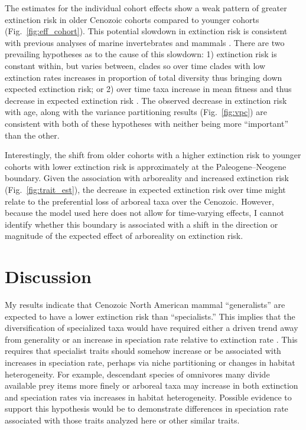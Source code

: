 \documentclass{pnastwo}
\begin{document}
\begin{article}
The estimates for the individual cohort effects show a weak pattern of greater extinction risk in older Cenozoic cohorts compared to younger cohorts (Fig.~\ref{fig:eff_cohort}). This potential slowdown in extinction risk is consistent with previous analyses of marine invertebrates \cite{Raup1982a,Foote2003} and mammals \cite{Alroy2010c,Alroy2000g}. There are two prevailing hypotheses as to the cause of this slowdown: 1) extinction risk is constant within, but varies between, clades so over time clades with low extinction rates increases in proportion of total diversity thus bringing down expected extinction risk; or 2) over time taxa increase in mean fitness and thus decrease in expected extinction risk \cite{Raup1982a}. The observed decrease in extinction risk with age, along with the variance partitioning results (Fig.~\ref{fig:vpc}) are consistent with both of these hypotheses with neither being more ``important'' than the other. 

Interestingly, the shift from older cohorts with a higher extinction risk to younger cohorts with lower extinction risk is approximately at the Paleogene--Neogene boundary. Given the association with arboreality and increased extinction risk (Fig.~\ref{fig:trait_est}), the decrease in expected extinction risk over time might relate to the preferential loss of arboreal taxa over the Cenozoic. However, because the model used here does not allow for time-varying effects, I cannot identify whether this boundary is associated with a shift in the direction or magnitude of the expected effect of arboreality on extinction risk.

\section{Discussion}
My results indicate that Cenozoic North American mammal ``generalists'' are expected to have a lower extinction risk than ``specialists.'' This implies that the diversification of specialized taxa would have required either a driven trend away from generality \cite{McShea1994a} or an increase in speciation rate relative to extinction rate \cite{Stanley1975}. This requires that specialist traits should somehow increase or be associated with increases in speciation rate, perhaps via niche partitioning or changes in habitat heterogeneity. For example, descendant species of omnivores many divide available prey items more finely or arboreal taxa may increase in both extinction and speciation rates via increases in habitat heterogeneity. Possible evidence to support this hypothesis would be to demonstrate differences in speciation rate associated with those traits analyzed here or other similar traits.


\end{article}
\end{document}

